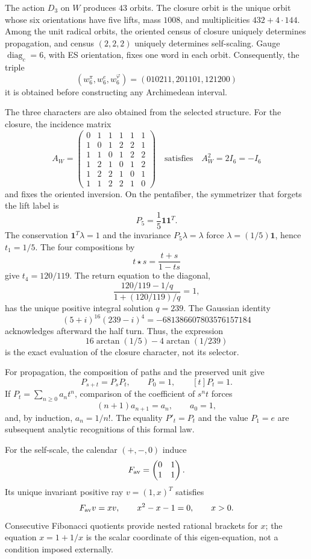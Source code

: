 The action \(D_3\) on \(W\) produces \(43\) orbits. The closure orbit
is the unique orbit whose six orientations have five lifts, mass \(1008\),
and multiplicities \(432+4\cdot144\). Among the unit radical orbits,
the oriented census of closure uniquely determines propagation, and census
\((2,2,2)\) uniquely determines self-scaling. Gauge
\(\operatorname{diag}_c=6\), with ES orientation, fixes one word in each
orbit. Consequently, the triple
\[
 (w_6^\pi,w_6^e,w_6^\varphi)
 =(010211,201101,121200)
\]
it is obtained before constructing any Archimedean interval.

The three characters are also obtained from the selected structure. For
the closure, the incidence matrix
\[
 A_W=\begin{pmatrix}
 0&1&1&1&1&1\\
 1&0&1&2&2&1\\
 1&1&0&1&2&2\\
 1&2&1&0&1&2\\
 1&2&2&1&0&1\\
 1&1&2&2&1&0
 \end{pmatrix}
 \quad\text{satisfies}\quad A_W^2=2I_6=-I_6
\]
and fixes the oriented inversion. On the pentafiber, the symmetrizer that
forgets the lift label is
\[
 P_5=\frac15\mathbf1\mathbf1^T.
\]
The conservation \(\mathbf1^T\lambda=1\) and the invariance
\(P_5\lambda=\lambda\) force \(\lambda=(1/5)\mathbf1\), hence
\(t_1=1/5\). The four
compositions by
\[
 t\star s=\frac{t+s}{1-ts}
\]
give \(t_4=120/119\). The return equation to the diagonal,
\[
 \frac{120/119-1/q}{1+(120/119)/q}=1,
\]
has the unique positive integral solution \(q=239\). The Gaussian
identity
\begin{equation}
 \label{eq:generacion-monodromica-identidad-gaussiana-rev7}
 (5+i)^{16}(239-i)^4=-681386607803576157184
\end{equation}
acknowledges afterward the half turn. Thus, the expression
\[
 16\arctan(1/5)-4\arctan(1/239)
\]
is the exact evaluation of the closure character, not its selector.

For propagation, the composition of paths and the preserved unit give
\[
 P_{s+t}=P_sP_t,\qquad P_0=1,\qquad [t]P_t=1.
\]
If \(P_t=\sum_{n\geq0}a_nt^n\), comparison of the coefficient of \(s^nt\)
forces
\[
 (n+1)a_{n+1}=a_n,\qquad a_0=1,
\]
and, by induction, \(a_n=1/n!\). The equality \(P'_t=P_t\) and the value
\(P_1=e\) are subsequent analytic recognitions of this formal law.

For the self-scale, the calendar \((+,-,0)\) induce
\[
 F_{\rm av}=\begin{pmatrix}0&1\\1&1\end{pmatrix}.
\]
Its unique invariant positive ray \(v=(1,x)^T\) satisfies
\[
 F_{\rm av}v=xv,\qquad x^2-x-1=0,\qquad x>0.
\]
Consecutive Fibonacci quotients provide nested rational brackets
for \(x\); the equation \(x=1+1/x\) is the scalar coordinate of
this eigen-equation, not a condition imposed externally.

